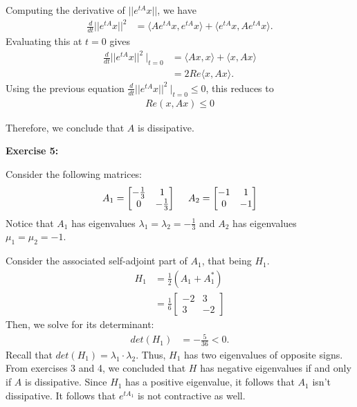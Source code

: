 \documentclass[12pt]{article}
\begin{document}
Computing the derivative of $||e^{tA}x||$, we have
\begin{align*}
    \frac{d}{dt} ||e^{tA}x||^2 & = \langle Ae^{tA}x, e^{tA}x \rangle + \langle e^{tA}x, Ae^{tA}x \rangle.
\end{align*}
Evaluating this at $t=0$ gives
\begin{align*}
    \frac{d}{dt} ||e^{tA}x||^2 ~\big|_{t=0} & = \langle Ax, x \rangle + \langle x, Ax \rangle \\
                                            & = 2Re\langle x, Ax \rangle.
\end{align*}
Using the previous equation $\frac{d}{dt} ||e^{tA}x||^2 ~\big|_{t=0} \leq 0$, this reduces to
\begin{align*}
    Re(x, Ax) \leq 0
\end{align*}

Therefore, we conclude that $A$ is dissipative.

\noindent{}\textbf{Exercise 5:}

Consider the following matrices:
\begin{align*}
    A_1 = \begin{bmatrix}
              -\frac{1}{3} & 1 \\ 0 & -\frac{1}{3}
          \end{bmatrix}
    \hspace{3ex}
    A_2 = \begin{bmatrix}
              -1 & 1 \\ 0 & -1
          \end{bmatrix}
\end{align*}
Notice that $A_1$ has eigenvalues $\lambda_1 = \lambda_2 = -\frac{1}{3}$
and $A_2$ has eigenvalues $\mu_1 = \mu_2 = -1$.

Consider the associated self-adjoint part of $A_1$, that being $H_1$.
\begin{align*}
    H_1 & = \frac{1}{2}(A_1 + A_1^*)        \\
        & = \frac{1}{6} \begin{bmatrix}
                            -2 & 3 \\ 3 & -2
                        \end{bmatrix}
\end{align*}
Then, we solve for its determinant:
\begin{align*}
    det(H_1) & = -\frac{5}{36} < 0.
\end{align*}
Recall that $det(H_1) = \lambda_1 \cdot \lambda_2$.
Thus, $H_1$ has two eigenvalues of opposite signs.
From exercises 3 and 4, we concluded that $H$ has negative eigenvalues if and only if $A$ is dissipative.
Since $H_1$ has a positive eigenvalue, it follows that $A_1$ isn't dissipative.
It follows that $e^{tA_1}$ is not contractive as well.
\end{document}
